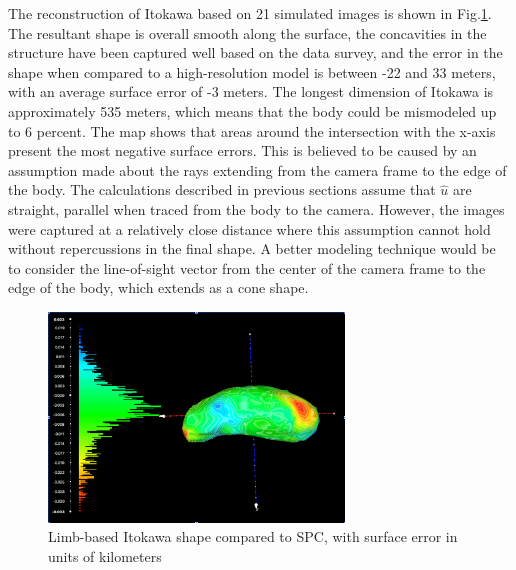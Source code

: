 The reconstruction of Itokawa based on 21 simulated images is shown in Fig.\ref{fig:itokawa_error}. The resultant shape is overall smooth along the surface, the concavities in the structure have been captured well based on the data survey, and the error in the shape when compared to a high-resolution model is between -22 and 33 meters, with an average surface error of -3 meters. The longest dimension of Itokawa is approximately 535 meters, which means that the body could be mismodeled up to 6 percent. The map shows that areas around the intersection with the x-axis present the most negative surface errors. This is believed to be caused by an assumption made about the rays extending from the camera frame to the edge of the body. The calculations described in previous sections assume that $\hat{u}$ are straight, parallel when traced from the body to the camera. However, the images were captured at a relatively close distance where this assumption cannot hold without repercussions in the final shape. A better modeling technique would be to consider the line-of-sight vector from the center of the camera frame to the edge of the body, which extends as a cone shape. 


\begin{figure}[h!]
    \centering
    \includegraphics[width = 0.7\textwidth]{fig/itokawa_sim.png}
    \caption{Limb-based Itokawa shape compared to SPC, with surface error in units of kilometers}
    \label{fig:itokawa_error}
\end{figure}


